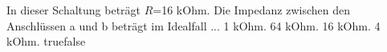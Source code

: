     {In dieser Schaltung beträgt $R$=16 kOhm. Die Impedanz zwischen den Anschlüssen a und b beträgt im Idealfall ...}
    {1 kOhm.}
    {64 kOhm.}
    {16 kOhm.}
    {4 kOhm.}
    {true}{false}